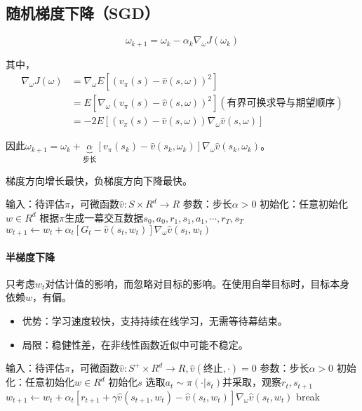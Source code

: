 \documentclass[
12pt, %
a4paper, 
oneside, %
headinclude,footinclude, %
]{scrartcl}
\begin{document}
\subsection[随机梯度下降]{随机梯度下降（SGD）}
$$ \omega_{k + 1} = \omega_k - \alpha_k \nabla_\omega J(\omega_k) $$

其中，
\begin{align*}
\nabla_\omega J(\omega)
&= \nabla_\omega E[(v_\pi(s) - \hat{v}(s, \omega))^2] \\
&= E[\nabla_\omega (v_\pi(s) - \hat{v}(s, \omega))^2] (\text{有界可换求导与期望顺序}) \\
&= -2E[(v_\pi(s) - \hat{v}(s, \omega)) \nabla_\omega \hat{v}(s, \omega)]
\end{align*}

因此$ \omega_{k + 1} = \omega_k + \underbrace{\alpha}_{\text{步长}}[v_\pi(s_k) - \hat{v}(s_k, \omega_k)]\nabla_\omega \hat{v}(s_k, \omega_k) $。

梯度方向增长最快，负梯度方向下降最快。
\begin{myalgorithm}[梯度MC]
\State 输入：待评估$ \pi $，可微函数$ \hat{v}: S \times R^d \to R $
\State 参数：步长$ \alpha > 0 $
\State 初始化：任意初始化$ w \in R^d $
\Loop {}
\State 根据$ \pi $生成一幕交互数据$ s_0, a_0, r_1, s_1, a_1, \cdots, r_T, s_T $
\State $ w_{t + 1} \gets w_t + \alpha_t[G_t - \hat{v}(s_t, w_t)]\nabla_{\omega} \hat{v}(s_t, w_t)$
\EndFor
\EndLoop
\end{myalgorithm}
\paragraph{半梯度下降}
只考虑$ w_t $对估计值的影响，而忽略对目标的影响。在使用自举目标时，目标本身依赖$ w $，有偏。
\begin{itemize}
\item 优势：学习速度较快，支持持续在线学习，无需等待幕结束。
\item 局限：稳健性差，在非线性函数近似中可能不稳定。
\end{itemize}
\begin{myalgorithm}[半梯度TD($ 0 $)]
\State 输入：待评估$ \pi $，可微函数$ \hat{v}:S^+ \times R^d \to R, \hat{v}(\text{终止}, \cdot) = 0 $
\State 参数：步长$ \alpha > 0 $
\State 初始化：任意初始化$ w \in R^d $
\Loop {}
\State 初始化$ s $
\State 选取$ a_t \sim \pi(\cdot|s_t) $并采取，观察$ r_t, s_{t + 1} $
\State $ w_{t + 1} \gets w_t + \alpha_t[r_{t + 1} + \gamma\hat{v}(s_{t + 1}, w_t) - \hat{v}(s_t, w_t)]\nabla_{\omega} \hat{v}(s_t, w_t) $
\State break
\EndIf
\EndFor
\EndLoop
\end{myalgorithm}
\end{document}
